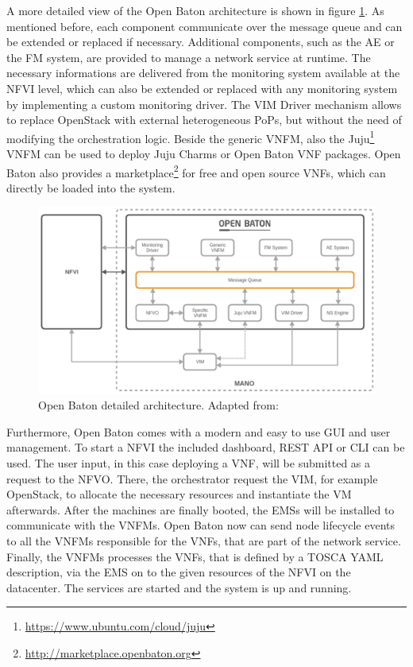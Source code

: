 A more detailed view of the Open Baton architecture is shown in figure \ref{fig:open_baton_detailed_architecture}.
As mentioned before, each component communicate over the message queue and can be extended or replaced if necessary.
Additional components, such as the \ac{AE} or the \ac{FM} system, are provided to manage a network service at runtime.\autocite[cf.]{openBatonDoc}
The necessary informations are delivered from the monitoring system available at the \ac{NFVI} level, which can also be extended or replaced with any monitoring system by implementing a custom monitoring driver.\autocite[cf.]{openBatonDoc}
The \ac{VIM} Driver mechanism allows to replace OpenStack with external heterogeneous \acp{PoP}, but without the need of modifying the orchestration logic.\autocite[cf.]{openBatonDoc}
Beside the generic \ac{VNFM}, also the Juju\footnote{\url{https://www.ubuntu.com/cloud/juju}} \ac{VNFM} can be used to deploy Juju Charms or Open Baton \ac{VNF} packages.
Open Baton also provides a marketplace\footnote{\url{http://marketplace.openbaton.org}} for free and open source \acp{VNF}, which can directly be loaded into the system.

\begin{figure}[H]
    \centering
    \includegraphics[width=\textwidth]{resources/images/open_baton_architecture.png}
    \caption[Open Baton detailed architecture]{Open Baton detailed architecture. Adapted from: \autocite{openBatonDoc}}
    \label{fig:open_baton_detailed_architecture}
\end{figure}

Furthermore, Open Baton comes with a modern and easy to use \ac{GUI} and user management.
To start a \ac{NFVI} the included dashboard, \ac{REST} \ac{API} or \ac{CLI} can be used.
The user input, in this case deploying a \ac{VNF}, will be submitted as a request to the \ac{NFVO}.
There, the orchestrator request the \ac{VIM}, for example OpenStack, to allocate the necessary resources and instantiate the \ac{VM} afterwards.
After the machines are finally booted, the \acp{EMS} will be installed to communicate with the \acp{VNFM}.
Open Baton now can send node lifecycle events to all the \acp{VNFM} responsible for the \acp{VNF}, that are part of the network service.
Finally, the \acp{VNFM} processes the \acp{VNF}, that is defined by a \ac{TOSCA} \ac{YAML} description, via the \ac{EMS} on to the given resources of the \ac{NFVI} on the datacenter.
The services are started and the system is up and running.


